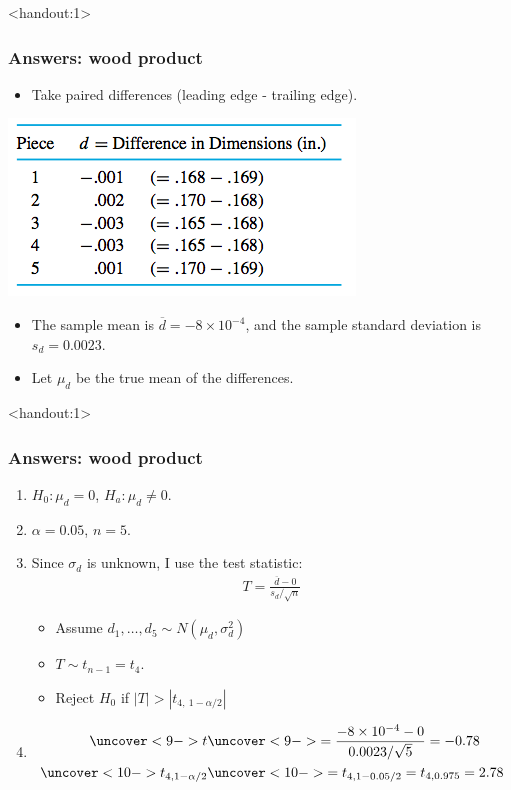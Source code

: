 \documentclass[handout]{beamer}\usepackage[]{graphicx}\usepackage[]{color}
\newcommand{\answers}{1}
\providecommand{\ov}[1]{\overline{#1}}
\numberwithin{equation}{section}
\begin{document}
\begin{frame}<handout:\answers>
\frametitle{Answers: wood product}
\begin{itemize}
\item Take paired differences (leading edge - trailing edge).
\end{itemize}
\begin{center}
 \includegraphics{../../fig/wooddiff.png}
\end{center}
\begin{itemize}
\pause \item The sample mean is $\ov{d} = -8 \times 10^{-4}$, and the sample standard deviation is $s_d = 0.0023$.
\pause \item Let $\mu_d$ be the true mean of the differences.
\end{itemize}
\end{frame}

\begin{frame}<handout:\answers>
\frametitle{Answers: wood product} \scriptsize
\begin{enumerate}[1. ]
\item $H_0: \mu_d = 0$, $H_a: \mu_d \ne 0$.
\pause \item $\alpha = 0.05$, $n = 5$.
\pause \item Since $\sigma_d$ is unknown, I use the test statistic:
\pause \begin{align*}
T = \frac{\ov{d} - 0}{s_d/\sqrt{n}}
\end{align*}
\begin{itemize}
\pause \item Assume $d_1, \ldots, d_5 \sim N(\mu_d, \sigma^2_d)$
\pause \item $T \sim t_{n -1} = t_4$.
\pause \item Reject $H_0$ if  $|T| > |t_{4, \ 1-\alpha/2}|$
\end{itemize}
\pause \item 
\begin{align*}
\uncover<9->{t} & \uncover<9->{=\frac{-8 \times 10^{-4} - 0}{0.0023/\sqrt{5}} =  -0.78} \\
\uncover<10->{t_{4, 1-\alpha/2}} & \uncover<10->{=t_{4, 1 - 0.05/2} = t_{4, 0.975} = 2.78}
\end{align*}
\end{enumerate}
\end{frame}
\end{document}
